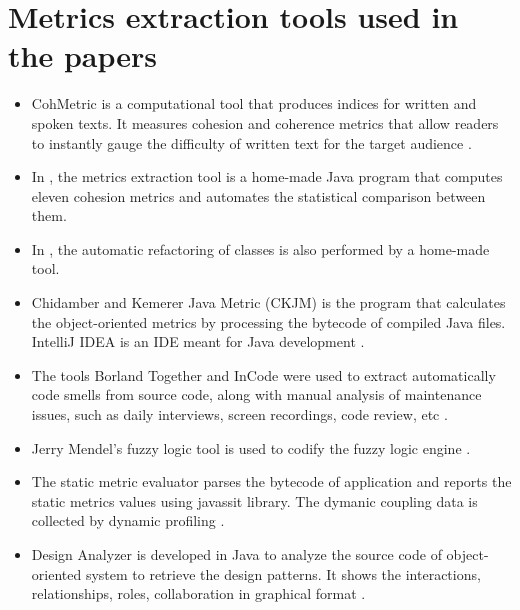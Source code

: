\section{Metrics extraction tools used in the papers}
\label{metrics_extraction_tools}

        \begin{itemize}
            
            \item CohMetric is a computational tool that produces indices for written and spoken texts. It measures cohesion and coherence metrics that allow readers to instantly gauge the difficulty of written text for the target audience \cite{s118_cohesion}.
            
            \item In \cite{s12_cohesion}, the metrics extraction tool is a home-made Java program that computes eleven cohesion metrics and automates the statistical comparison between them. 
            \item In \cite{s29_cohesion}, the automatic refactoring of classes is also performed by a home-made tool.
            
            \item Chidamber and Kemerer Java Metric (CKJM) is the program that calculates the object-oriented metrics by processing the bytecode of compiled Java files. IntelliJ IDEA is an IDE meant for Java development \cite{s116_maintainability}.
           
            \item The tools  Borland Together and InCode were used to extract automatically code smells from source code, along with manual analysis of maintenance issues, such as daily interviews, screen recordings, code review, etc \cite{s219_maintainability}.
            
            \item Jerry Mendel's fuzzy logic tool is used to codify the fuzzy logic engine \cite{s13_maintainability}.
             
            \item The static metric evaluator parses the bytecode of application and reports the static metrics values using javassit library. The dymanic coupling data is collected by dynamic profiling \cite{s88_coupling}.
            
            \item Design Analyzer is developed in Java to analyze the source code of object-oriented system to retrieve the design patterns. It shows the interactions, relationships, roles, collaboration in graphical format \cite{s23_coupling}.
            

\end{itemize}
